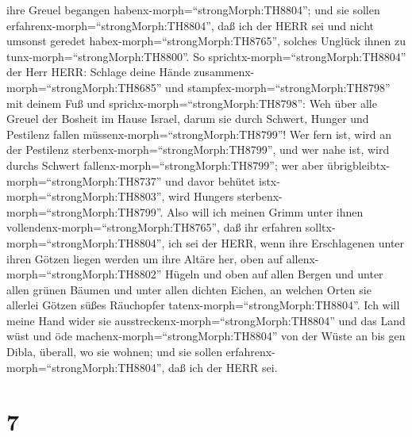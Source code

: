 ihre Greuel begangen habenx-morph=``strongMorph:TH8804''; 
und sie sollen erfahrenx-morph=``strongMorph:TH8804'', daß ich der HERR
sei und nicht umsonst geredet habex-morph=``strongMorph:TH8765'',
solches Unglück ihnen zu tunx-morph=``strongMorph:TH8800''.
 So sprichtx-morph=``strongMorph:TH8804'' der Herr HERR:
Schlage deine Hände zusammenx-morph=``strongMorph:TH8685'' und
stampfex-morph=``strongMorph:TH8798'' mit deinem Fuß und
sprichx-morph=``strongMorph:TH8798'': Weh über alle Greuel der Bosheit
im Hause Israel, darum sie durch Schwert, Hunger und Pestilenz fallen
müssenx-morph=``strongMorph:TH8799''!  Wer fern ist, wird
an der Pestilenz sterbenx-morph=``strongMorph:TH8799'', und wer nahe
ist, wird durchs Schwert fallenx-morph=``strongMorph:TH8799''; wer aber
übrigbleibtx-morph=``strongMorph:TH8737'' und davor behütet
istx-morph=``strongMorph:TH8803'', wird Hungers
sterbenx-morph=``strongMorph:TH8799''. Also will ich meinen Grimm unter
ihnen vollendenx-morph=``strongMorph:TH8765'',  daß ihr
erfahren solltx-morph=``strongMorph:TH8804'', ich sei der HERR, wenn
ihre Erschlagenen unter ihren Götzen liegen werden um ihre Altäre her,
oben auf allenx-morph=``strongMorph:TH8802'' Hügeln und oben auf allen
Bergen und unter allen grünen Bäumen und unter allen dichten Eichen, an
welchen Orten sie allerlei Götzen süßes Räuchopfer
tatenx-morph=``strongMorph:TH8804''.  Ich will meine Hand
wider sie ausstreckenx-morph=``strongMorph:TH8804'' und das Land wüst
und öde machenx-morph=``strongMorph:TH8804'' von der Wüste an bis gen
Dibla, überall, wo sie wohnen; und sie sollen
erfahrenx-morph=``strongMorph:TH8804'', daß ich der HERR sei.

\hypertarget{section-6}{%
\section{7}\label{section-6}}

